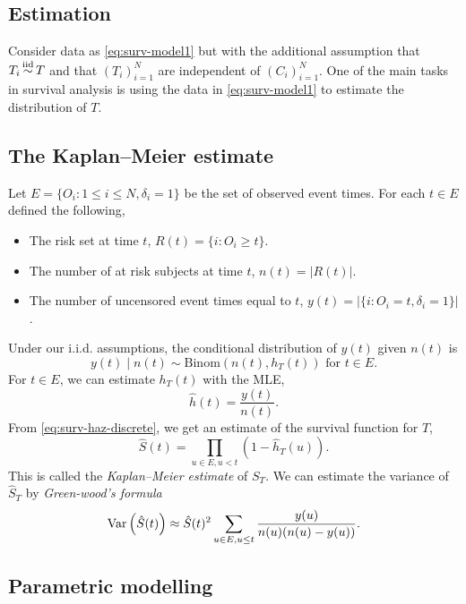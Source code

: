 \subsection{Estimation}

Consider data as \eqref{eq:surv-model1} but with the additional assumption that $T_i \simiid T$ and that $(T_i)_{i=1}^N$ are independent of  $(C_i)_{i=1}^N$. One of the main tasks in survival analysis is using the data in \eqref{eq:surv-model1} to estimate the distribution of $T$. 

\subsection*{The Kaplan--Meier estimate}

Let $E = \{O_i : 1 \le i \le N, \delta_i = 1\}$ be the set of observed event times. For each $t \in E$ defined the following,
\begin{itemize}
    \item The risk set at time $t$, $R(t) = \{i:O_i \ge t\}$.
    \item The number of at risk subjects at time $t$, $n(t) = |R(t)|$.
    \item The number of uncensored event times equal to $t$, $y(t) = |\{i : O_i =t, \delta_i=1\}|$. 
\end{itemize}
Under our i.i.d. assumptions, the conditional distribution of $y(t)$ given $n(t)$ is
\[y(t) \mid n(t) \sim \mathrm{Binom}(n(t),h_T(t)) \text{ for } t \in E. \]
For $t \in E$, we can estimate $h_T(t)$ with the MLE,
\[\hat{h}(t) = \frac{y(t)}{n(t)}. \]
From \eqref{eq:surv-haz-discrete}, we get an estimate of the survival function for $T$,
\[\hat{S}(t) = \prod_{u \in E, u < t}(1-\hat{h}_T(u)). \]
This is called the \emph{Kaplan--Meier estimate} of $S_T$. We can estimate the variance of  $\hat{S}_T$ by \emph{Green-wood's formula}
\[\mathrm{Var}\left(\hat{S}(t)\right) \approx \hat{S}(t)^2 \sum_{u \in E, u \le t} \frac{y(u)}{n(u)(n(u)-y(u))}.\]

\subsection*{Parametric modelling}


